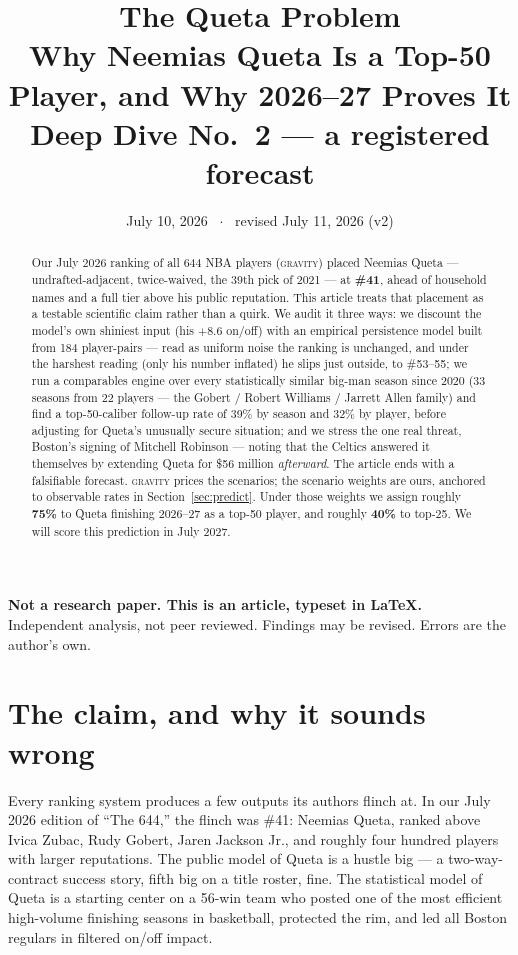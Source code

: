 \documentclass[11pt]{article}
\title{\textbf{The Queta Problem}\\[4pt]
\large Why Neemias Queta Is a Top-50 Player, and Why 2026--27 Proves It\\[2pt]
\normalsize \gravity{} Deep Dive No.\ 2 --- a registered forecast}
\author{}
\date{July 10, 2026 \ $\cdot$ \ revised July 11, 2026 (v2)}
\newcommand{\gravity}{\textsc{gravity}}
\newcommand{\statusnote}{\par\noindent\begin{center}%
\colorbox{fade!25}{\parbox{0.93\textwidth}{\centering\small
\textbf{Not a research paper. This is an article, typeset in \LaTeX.}\\[2pt]
Independent analysis, not peer reviewed. Findings may be revised. Errors are the author's own.}}%
\end{center}\smallskip}
\begin{document}
\maketitle
\vspace{-2.5em}
\statusnote

\begin{abstract}
\noindent
Our July 2026 ranking of all 644 NBA players (\gravity{}) placed Neemias Queta ---
undrafted-adjacent, twice-waived, the 39th pick of 2021 --- at \textbf{\#41}, ahead of
household names and a full tier above his public reputation. This article treats that
placement as a testable scientific claim rather than a quirk. We audit it three ways:
we discount the model's own shiniest input (his $+8.6$ on/off) with an empirical
persistence model built from 184 player-pairs --- read as uniform noise the ranking is
unchanged, and under the harshest reading (only his number inflated) he slips just
outside, to \#53--55; we run a comparables engine over every statistically similar
big-man season since 2020 (33 seasons from 22 players --- the Gobert / Robert Williams /
Jarrett Allen family) and find a top-50-caliber follow-up rate of 39\% by season and
32\% by player, before adjusting for Queta's unusually secure situation; and we stress
the one real threat, Boston's signing of Mitchell Robinson --- noting that the Celtics
answered it themselves by extending Queta for \$56 million \emph{afterward}. The article
ends with a falsifiable forecast. \gravity{} prices the scenarios; the scenario weights
are ours, anchored to observable rates in Section~\ref{sec:predict}. Under those
weights we assign roughly \textbf{75\%} to Queta finishing 2026--27 as a top-50 player,
and roughly \textbf{40\%} to top-25. We will score this prediction in July 2027.
\end{abstract}

\section{The claim, and why it sounds wrong}

Every ranking system produces a few outputs its authors flinch at. In our July 2026
edition of ``The 644,'' the flinch was \#41: Neemias Queta, ranked above Ivica Zubac,
Rudy Gobert, Jaren Jackson Jr., and roughly four hundred players with larger reputations.
The public model of Queta is a hustle big --- a two-way-contract success story, fifth big
on a title roster, fine. The statistical model of Queta is a starting center on a 56-win
team who posted one of the most efficient high-volume finishing seasons in basketball,
protected the rim, and led all Boston regulars in filtered on/off impact.
\end{document}
